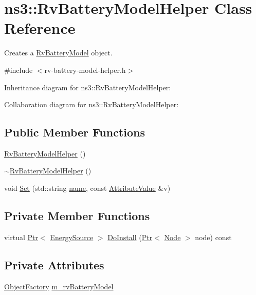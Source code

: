 \hypertarget{classns3_1_1RvBatteryModelHelper}{}\section{ns3\+:\+:Rv\+Battery\+Model\+Helper Class Reference}
\label{classns3_1_1RvBatteryModelHelper}


Creates a \hyperlink{classns3_1_1RvBatteryModel}{Rv\+Battery\+Model} object.  




{\ttfamily \#include $<$rv-\/battery-\/model-\/helper.\+h$>$}



Inheritance diagram for ns3\+:\+:Rv\+Battery\+Model\+Helper\+:


Collaboration diagram for ns3\+:\+:Rv\+Battery\+Model\+Helper\+:
\subsection*{Public Member Functions}
\begin{DoxyCompactItemize}
\item 
\hyperlink{classns3_1_1RvBatteryModelHelper_a0e8b9e69975f38d280b7f628a91f62a0}{Rv\+Battery\+Model\+Helper} ()
\item 
\hyperlink{classns3_1_1RvBatteryModelHelper_ae3c381235ffbc584fba462ebe8d54b56}{$\sim$\+Rv\+Battery\+Model\+Helper} ()
\item 
void \hyperlink{classns3_1_1RvBatteryModelHelper_a28f5eedc180d45310324ca3bd1868af1}{Set} (std\+::string \hyperlink{generate__test__data__lte__spectrum__model_8m_ab74e6bf80237ddc4109968cedc58c151}{name}, const \hyperlink{classns3_1_1AttributeValue}{Attribute\+Value} \&v)
\end{DoxyCompactItemize}
\subsection*{Private Member Functions}
\begin{DoxyCompactItemize}
\item 
virtual \hyperlink{classns3_1_1Ptr}{Ptr}$<$ \hyperlink{classns3_1_1EnergySource}{Energy\+Source} $>$ \hyperlink{classns3_1_1RvBatteryModelHelper_aceba08f2b9500b33f225b0abcd2ec65b}{Do\+Install} (\hyperlink{classns3_1_1Ptr}{Ptr}$<$ \hyperlink{classns3_1_1Node}{Node} $>$ node) const 
\end{DoxyCompactItemize}
\subsection*{Private Attributes}
\begin{DoxyCompactItemize}
\item 
\hyperlink{classns3_1_1ObjectFactory}{Object\+Factory} \hyperlink{classns3_1_1RvBatteryModelHelper_a9721419b5b8c97f3a0c886c4b0b647ba}{m\+\_\+rv\+Battery\+Model}
\end{DoxyCompactItemize}


